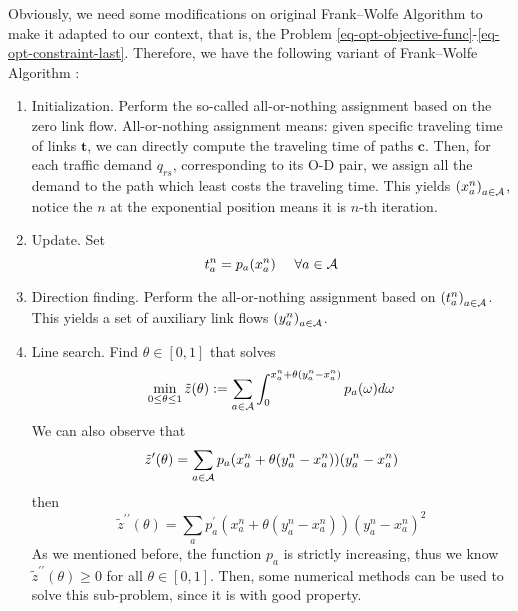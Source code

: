 \documentclass{article}
\begin{document}
Obviously, we need some modifications on original Frank–Wolfe Algorithm to make it adapted to our context, that is, the Problem \ref{eq-opt-objective-func}-\ref{eq-opt-constraint-last}. Therefore, we have the following variant of Frank–Wolfe Algorithm \cite{Shef85}:

\begin{enumerate}[start=0, label={\bfseries Step \arabic*}]
    
    \item Initialization. Perform the so-called all-or-nothing assignment based on the zero link flow. All-or-nothing assignment means: given specific traveling time of links $ \boldsymbol{t} $, we can directly compute the traveling time of paths $ \boldsymbol{c} $. Then, for each traffic demand $ q_{rs} $, corresponding to its O-D pair, we assign all the demand to the path which least costs the traveling time. This yields $ \left(x^n_a\right)_{a \in \mathcal{A}} $, notice the $ n $ at the exponential position means it is $ n $-th iteration.

    \item Update. Set
    \begin{equation*}
        t^n_a = p_a(x^n_a) ~~~~ \forall a \in \mathcal{A} 
    \end{equation*}

    \item Direction finding. Perform the all-or-nothing assignment based on $ \left(t^n_a\right)_{a \in \mathcal{A}} $. This yields a set of auxiliary link flows $ \left(y^n_a\right)_{a \in \mathcal{A}} $.

    \item Line search. Find $ \theta \in [0, 1] $ that solves
    \begin{equation*}
        \min_{0 \le \theta \le 1} \tilde{z} (\theta) := \sum_{a \in \mathcal{A}} \int^{x^n_a+\theta(y^n_a-x^n_a)}_0 p_a(\omega) d\omega
    \end{equation*}
    We can also observe that
    \begin{equation*}
        \tilde{z}^\prime(\theta) = \sum_{a \in \mathcal{A}} p_a(x^n_a+\theta(y^n_a-x^n_a)) (y^n_a-x^n_a)
    \end{equation*}
    then
    \begin{equation*}
        \tilde{z}^{\prime\prime}(\theta) = \sum_a p^\prime_a(x^n_a+\theta(y^n_a-x^n_a)) (y^n_a-x^n_a)^2
    \end{equation*}
    As we mentioned before, the function $ p_a $ is strictly increasing, thus we know $ \tilde{z}^{\prime\prime}(\theta) \ge 0 $ for all $ \theta \in [0, 1] $. Then, some numerical methods can be used to solve this sub-problem, since it is with good property.


\end{enumerate}
\end{document}
